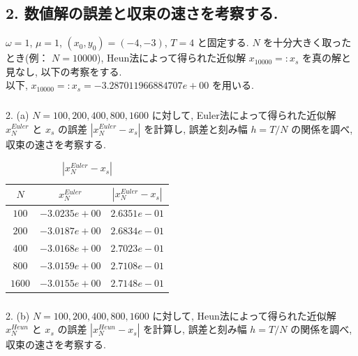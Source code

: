 \documentclass[11pt]{jsarticle}
\begin{document}
\subsection{2. 数値解の誤差と収束の速さを考察する. }
$\omega = 1$, $\mu = 1$, $(x_{0}, y_{0}) = (-4, -3)$, $T = 4$ と固定する. $N$ を十分大きく取ったとき(例： $N = 10000$), Heun法によって得られた近似解 $x_{10000} =: x_{s}$ を真の解と見なし, 以下の考察をする. \\
以下, $x_{10000} =: x_{s} = -3.287011966884707e+00$ を用いる. 

\subsubsection{}
\begin{itembox}[l]{2. (a)}
$N = 100, 200, 400, 800, 1600$ に対して, Euler法によって得られた近似解 $x^{Euler}_{N}$ と $x_{s}$ の誤差 $|x^{Euler}_{N} - x_{s}|$ を計算し, 誤差と刻み幅 $h = T/N$ の関係を調べ, 収束の速さを考察する. 
\end{itembox}

\begin{table}[htbp]
\centering
\begin{tabular}{|c||c|c|} \hline
\textbf{$N$} & \textbf{$x^{Euler}_{N}$} & \textbf{$|x^{Euler}_{N}-x_{s}|$} \\ \hline
$100$ & $-3.0235e+00$ & $2.6351e-01$ \\ \hline
$200$ & $-3.0187e+00$ & $2.6834e-01$ \\ \hline
$400$ & $-3.0168e+00$ & $2.7023e-01$ \\ \hline
$800$ & $-3.0159e+00$ & $ 2.7108e-01$ \\ \hline
$1600$ & $-3.0155e+00$ & $2.7148e-01$ \\ \hline
\end{tabular}
\caption{$|x^{Euler}_{N}-x_{s}|$}
\end{table}

\subsubsection{}
\begin{itembox}[l]{2. (b)}
$N = 100, 200, 400, 800, 1600$ に対して, Heun法によって得られた近似解 $x^{Heun}_{N}$ と $x_{s}$ の誤差 $|x^{Heun}_{N} - x_{s}|$ を計算し, 誤差と刻み幅 $h = T/N$ の関係を調べ, 収束の速さを考察する.
\end{itembox}
\end{document}
